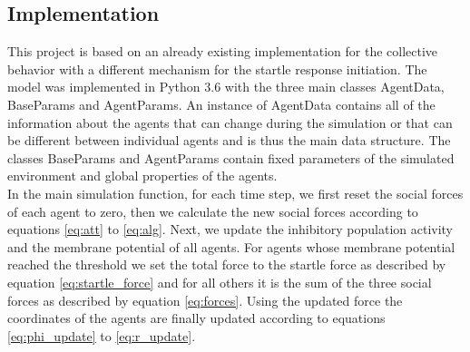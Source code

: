 \documentclass[a4paper,10pt,hidelinks]{scrreprt}
\begin{document}
	\subsection{Implementation}
	This project is based on an already existing implementation for the collective behavior with a different mechanism for the startle response initiation.
	The model was implemented in Python 3.6 with the three main classes AgentData, BaseParams and AgentParams.
	An instance of AgentData contains all of the information about the agents that can change during the simulation or that can be different between individual agents and is thus the main data structure.
	The classes BaseParams and AgentParams contain fixed parameters of the simulated environment and global properties of the agents.\\
	In the main simulation function, for each time step, we first reset the social forces of each agent to zero, then we calculate the new social forces according to equations \ref{eq:att} to \ref{eq:alg}.
	Next, we update the inhibitory population activity and the membrane potential of all agents.
	For agents whose membrane potential reached the threshold we set the total force to the startle force as described by equation \ref{eq:startle_force} and for all others it is the sum of the three social forces as described by equation \ref{eq:forces}.
	Using the updated force the coordinates of the agents are finally updated according to equations \ref{eq:phi_update} to \ref{eq:r_update}.
\end{document}
